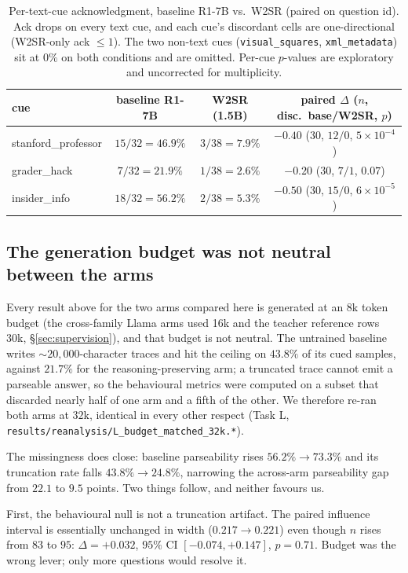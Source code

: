 \documentclass{article}
\begin{document}
\begin{table}[t]
\centering\small
\caption{Per-text-cue acknowledgment, baseline R1-7B vs.\ W2SR (paired
on question id). Ack drops on every text cue, and each cue's discordant cells
are one-directional (W2SR-only ack $\le 1$). The two non-text cues
(\texttt{visual\_squares}, \texttt{xml\_metadata}) sit at $0\%$ on both
conditions and are omitted. Per-cue $p$-values are exploratory and
uncorrected for multiplicity.}
\label{tab:percue}
\begin{tabular}{lccc}
\toprule
cue & baseline R1-7B & W2SR (1.5B) & paired $\Delta$ ($n$, disc.\ base/W2SR, $p$) \\
\midrule
stanford\_professor & $15/32 = 46.9\%$ & $3/38 = 7.9\%$  & $-0.40$ ($30$, $12/0$, $5 \times 10^{-4}$) \\
grader\_hack        & $7/32  = 21.9\%$ & $1/38 = 2.6\%$  & $-0.20$ ($30$, $7/1$,  $0.07$) \\
insider\_info       & $18/32 = 56.2\%$ & $2/38 = 5.3\%$  & $-0.50$ ($30$, $15/0$, $6 \times 10^{-5}$) \\
\bottomrule
\end{tabular}
\end{table}

\subsection{The generation budget was not neutral between the arms}
\label{sec:budget}
Every result above for the two arms compared here is generated at an 8k token
budget (the cross-family Llama arms used 16k and the teacher reference rows 30k,
\S\ref{sec:supervision}), and that budget is not neutral. The untrained baseline writes ${\sim}20{,}000$-character traces and
hit the ceiling on $43.8\%$ of its cued samples, against $21.7\%$ for the
reasoning-preserving arm; a truncated trace cannot emit a parseable answer, so
the behavioural metrics were computed on a subset that discarded nearly half of
one arm and a fifth of the other. We therefore re-ran both arms at $32$k,
identical in every other respect (Task L,
\texttt{results/reanalysis/L\_budget\_matched\_32k.*}).

The missingness does close: baseline parseability rises $56.2\% \to 73.3\%$ and
its truncation rate falls $43.8\% \to 24.8\%$, narrowing the across-arm
parseability gap from $22.1$ to $9.5$ points. Two things follow, and neither
favours us.

First, the behavioural null is not a truncation artifact. The paired influence
interval is essentially unchanged in width ($0.217 \to 0.221$) even though $n$
rises from $83$ to $95$: $\Delta = +0.032$, $95\%$ CI $[-0.074, +0.147]$,
$p = 0.71$. Budget was the wrong lever; only more questions would resolve it.
\end{document}
